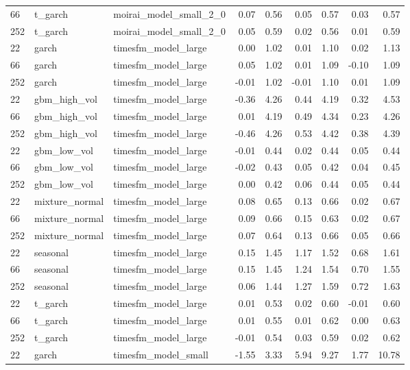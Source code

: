 {\begin{tabular}{lllrrrrrr}
66 & t\_garch & moirai\_model\_small\_2\_0 & 0.07 & 0.56 & 0.05 & 0.57 & 0.03 & 0.57 \\
252 & t\_garch & moirai\_model\_small\_2\_0 & 0.05 & 0.59 & 0.02 & 0.56 & 0.01 & 0.59 \\
\midrule
22 & garch & timesfm\_model\_large & 0.00 & 1.02 & 0.01 & 1.10 & 0.02 & 1.13 \\
66 & garch & timesfm\_model\_large & 0.05 & 1.02 & 0.01 & 1.09 & -0.10 & 1.09 \\
252 & garch & timesfm\_model\_large & -0.01 & 1.02 & -0.01 & 1.10 & 0.01 & 1.09 \\
\midrule
22 & gbm\_high\_vol & timesfm\_model\_large & -0.36 & 4.26 & 0.44 & 4.19 & 0.32 & 4.53 \\
66 & gbm\_high\_vol & timesfm\_model\_large & 0.01 & 4.19 & 0.49 & 4.34 & 0.23 & 4.26 \\
252 & gbm\_high\_vol & timesfm\_model\_large & -0.46 & 4.26 & 0.53 & 4.42 & 0.38 & 4.39 \\
\midrule
22 & gbm\_low\_vol & timesfm\_model\_large & -0.01 & 0.44 & 0.02 & 0.44 & 0.05 & 0.44 \\
66 & gbm\_low\_vol & timesfm\_model\_large & -0.02 & 0.43 & 0.05 & 0.42 & 0.04 & 0.45 \\
252 & gbm\_low\_vol & timesfm\_model\_large & 0.00 & 0.42 & 0.06 & 0.44 & 0.05 & 0.44 \\
\midrule
22 & mixture\_normal & timesfm\_model\_large & 0.08 & 0.65 & 0.13 & 0.66 & 0.02 & 0.67 \\
66 & mixture\_normal & timesfm\_model\_large & 0.09 & 0.66 & 0.15 & 0.63 & 0.02 & 0.67 \\
252 & mixture\_normal & timesfm\_model\_large & 0.07 & 0.64 & 0.13 & 0.66 & 0.05 & 0.66 \\
\midrule
22 & seasonal & timesfm\_model\_large & 0.15 & 1.45 & 1.17 & 1.52 & 0.68 & 1.61 \\
66 & seasonal & timesfm\_model\_large & 0.15 & 1.45 & 1.24 & 1.54 & 0.70 & 1.55 \\
252 & seasonal & timesfm\_model\_large & 0.06 & 1.44 & 1.27 & 1.59 & 0.72 & 1.63 \\
\midrule
22 & t\_garch & timesfm\_model\_large & 0.01 & 0.53 & 0.02 & 0.60 & -0.01 & 0.60 \\
66 & t\_garch & timesfm\_model\_large & 0.01 & 0.55 & 0.01 & 0.62 & 0.00 & 0.63 \\
252 & t\_garch & timesfm\_model\_large & -0.01 & 0.54 & 0.03 & 0.59 & 0.02 & 0.62 \\
\midrule
22 & garch & timesfm\_model\_small & -1.55 & 3.33 & 5.94 & 9.27 & 1.77 & 10.78 \\

\end{tabular}}
